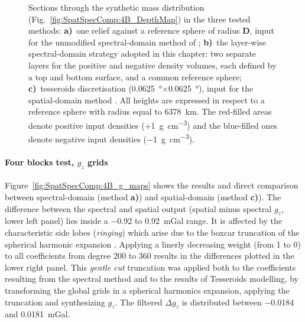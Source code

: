 \begin{subappendices}
\begin{figure} %
    \begin{adjustbox}{center}
    \end{adjustbox}
    \caption[Sections trough the synthetic mass distribution in the three tested modelling methods]{
        Sections through the synthetic mass distribution (Fig.~\ref{fig:SpatSpecComp:4B_DepthMap}) in the three tested methods:
        \textbf{a)}~one relief against a reference sphere of radius $\bm{D}$, input for the unmodified spectral-domain method of \textcite{Wieczorek2007};
        \textbf{b)}~the layer-wise spectral-domain strategy adopted in this chapter: two separate layers for the positive and negative density volumes, each defined by a top and bottom surface, and a common reference sphere;
        \textbf{c)}~tesseroids discretisation (\SI{0.0625}{\degree}$\times$\SI{0.0625}{\degree}), input for the spatial-domain method \parencite{Uieda2016}.
        All heights are expressed in respect to a reference sphere with radius equal to \SI{6378}{\kilo \metre}.
        The red-filled areas denote positive input densities ($+$\SI{1}{\gram \per \cubic \centi \metre}) and the blue-filled ones denote negative input densities (\SI{-1}{\gram \per \cubic \centi \metre}).}
    \label{fig:SpatSpecComp:4B_sections}
\end{figure}

\paragraph*{Four blocks test, $g_z$ grids}
Figure~\ref{fig:SpatSpecComp:4B_g_maps} shows the results and direct comparison between spectral-domain (method \textbf{a)}) and spatial-domain (method \textbf{c)}).
The difference between the spectral and spatial output (spatial minus spectral $g_z$, lower left panel) lies inside a \num{-0.92} to \SI{0.92}{\milli Gal} range.
It is affected by the characteristic side lobes (\textit{ringing}) which arise due to the boxcar truncation of the spherical harmonic expansion \parencite{BarthelmesGentleCut2008}.
Applying a linerly decreasing weight (from 1 to 0) to all coefficients from degree 200 to 360 results in the differences plotted in the lower right panel.
This \textit{gentle cut} truncation was applied both to the coefficients resulting from the spectral method and to the results of Tesseroids modelling, by transforming the global grids in a spherical harmonics expansion, applying the truncation and synthesizing $g_z$.
The filtered $\Delta g_z$ is distributed between \num{-0.0184} and \SI{0.0181}{\milli Gal}.


\end{subappendices}
